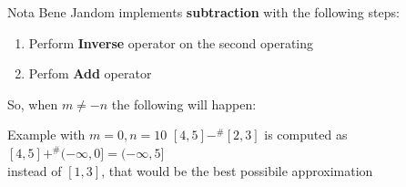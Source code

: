 \documentclass{beamer}
\begin{document}
	\begin{frame}{Nota Bene}
		Jandom implements \textbf{subtraction} with the following steps:\\
		\begin{enumerate}
			\item Perform \textbf{Inverse} operator on the second operating
			\item Perfom \textbf{Add} operator\\
		\end{enumerate}
		So, when $m \neq -n$ the following will happen:
			\begin{exampleblock}{Example with $m = 0, n = 10$}
				$[4,5] -^\# [2,3]$ is computed as $[4,5] +^\# (-\infty,0] = (-\infty,5]$ \\instead of $[1,3]$, that would be the best possibile approximation
			\end{exampleblock}
	\end{frame}
\end{document}
